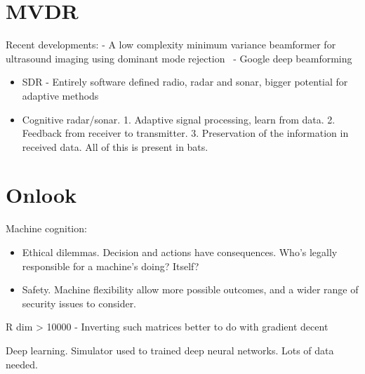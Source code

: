 %      
%      


\section{MVDR}

Recent developments:
- A low complexity minimum variance beamformer for ultrasound imaging using dominant mode rejection~\cite{Jiang2016}
- Google deep beamforming

\begin{itemize}
\item SDR - Entirely software defined radio, radar and sonar, bigger potential for adaptive methods
\item Cognitive radar/sonar. 1. Adaptive signal processing, learn from data. 2. Feedback from receiver to transmitter. 3. Preservation of the information in received data. All of this is present in bats.
\end{itemize}


\section{Onlook}

Machine cognition:
\begin{itemize}
\item Ethical dilemmas. Decision and actions have consequences. Who's legally responsible for a machine's doing? Itself?
\item Safety. Machine flexibility allow more possible outcomes, and a wider range of security issues to consider.
\end{itemize}

R dim > 10000
- Inverting such matrices better to do with gradient decent


Deep learning. Simulator used to trained deep neural networks. Lots of data needed.




\section{}

